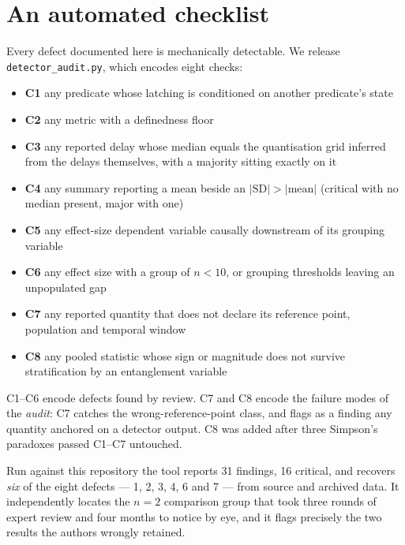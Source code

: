 \documentclass[11pt,letterpaper]{article}
\begin{document}
\section{An automated checklist}

Every defect documented here is mechanically detectable. We release
\texttt{detector\_audit.py}, which encodes eight checks:

\begin{itemize}
\item \textbf{C1} any predicate whose latching is conditioned on another
      predicate's state
\item \textbf{C2} any metric with a definedness floor
\item \textbf{C3} any reported delay whose median equals the
      quantisation grid inferred from the delays themselves, with a
      majority sitting exactly on it
\item \textbf{C4} any summary reporting a mean beside an
      $|\mathrm{SD}| > |\mathrm{mean}|$ (critical with no median
      present, major with one)
\item \textbf{C5} any effect-size dependent variable causally downstream
      of its grouping variable
\item \textbf{C6} any effect size with a group of $n < 10$, or grouping
      thresholds leaving an unpopulated gap
\item \textbf{C7} any reported quantity that does not declare its
      reference point, population and temporal window
\item \textbf{C8} any pooled statistic whose sign or magnitude does not
      survive stratification by an entanglement variable
\end{itemize}

C1--C6 encode defects found by review. C7 and C8 encode the failure modes
of the \emph{audit}: C7 catches the wrong-reference-point class, and
flags as a finding any quantity anchored on a detector output. C8 was
added after three Simpson's paradoxes passed C1--C7 untouched.

Run against this repository the tool reports 31 findings, 16 critical,
and recovers \emph{six} of the eight defects --- 1, 2, 3, 4, 6 and 7 ---
from source and archived data. It independently locates the $n = 2$
comparison group that took three rounds of expert review and four months
to notice by eye, and it flags precisely the two results the authors
wrongly retained.
\end{document}
